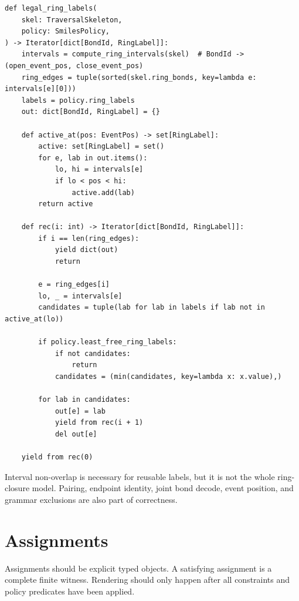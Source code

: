 \documentclass[10pt,a4paper]{article}
\theoremstyle{definition}
\theoremstyle{remark}
\begin{document}
\begin{lstlisting}
def legal_ring_labels(
    skel: TraversalSkeleton,
    policy: SmilesPolicy,
) -> Iterator[dict[BondId, RingLabel]]:
    intervals = compute_ring_intervals(skel)  # BondId -> (open_event_pos, close_event_pos)
    ring_edges = tuple(sorted(skel.ring_bonds, key=lambda e: intervals[e][0]))
    labels = policy.ring_labels
    out: dict[BondId, RingLabel] = {}

    def active_at(pos: EventPos) -> set[RingLabel]:
        active: set[RingLabel] = set()
        for e, lab in out.items():
            lo, hi = intervals[e]
            if lo < pos < hi:
                active.add(lab)
        return active

    def rec(i: int) -> Iterator[dict[BondId, RingLabel]]:
        if i == len(ring_edges):
            yield dict(out)
            return

        e = ring_edges[i]
        lo, _ = intervals[e]
        candidates = tuple(lab for lab in labels if lab not in active_at(lo))

        if policy.least_free_ring_labels:
            if not candidates:
                return
            candidates = (min(candidates, key=lambda x: x.value),)

        for lab in candidates:
            out[e] = lab
            yield from rec(i + 1)
            del out[e]

    yield from rec(0)
\end{lstlisting}

Interval non-overlap is necessary for reusable labels, but it is not the whole
ring-closure model.  Pairing, endpoint identity, joint bond decode, event
position, and grammar exclusions are also part of correctness.

\section{Assignments}
\label{s:assignments}

Assignments should be explicit typed objects.  A satisfying assignment is a
complete finite witness.  Rendering should only happen after all constraints and
policy predicates have been applied.
\end{document}
